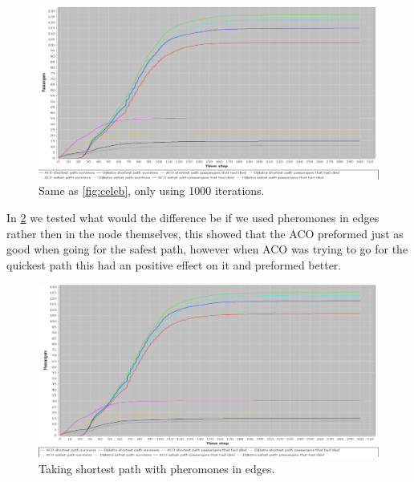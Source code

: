\begin{figure} [h]
\centering
\hspace*{-1.0in}
\includegraphics[scale=0.35]{images/Graph-using-1000-rounds-140-passangers.png}
\caption{Same as \ref{fig:celeb}, only using 1000 iterations.}
\label{fig:celeb1000}
\end{figure}




In \ref{fig:celebPherInEdge} we tested what would the difference be if we used pheromones in edges rather then in the node themselves, this showed that the ACO preformed just as good when going for the safest path, however when ACO was trying to go for the quickest path this had an positive effect on it and preformed better.

\begin{figure} [h]
\centering
\hspace*{-1.0in}
\includegraphics[scale=0.35]{images/Graph-using-200-rounds-140-passangers-and-one-hazzard-and-ACO-having-pheremons-in-edges.png}
\caption{Taking shortest path with pheromones in edges.}
\label{fig:celebPherInEdge}
\end{figure}



